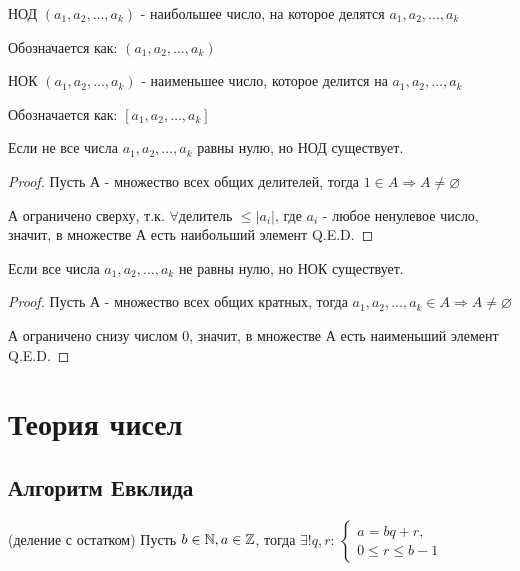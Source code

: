 \begin{definition}
    НОД $(a_1, a_2, \ldots, a_k)$ - наибольшее число, на которое делятся $a_1, a_2, \ldots, a_k$

    Обозначается как: $(a_1, a_2, \ldots, a_k)$
\end{definition}

\begin{definition}
    НОК $(a_1, a_2, \ldots, a_k)$ - наименьшее число, которое делится на $a_1, a_2, \ldots, a_k$

    Обозначается как: $[a_1, a_2, \ldots, a_k]$
\end{definition}

\begin{theorem}
    Если не все числа $a_1, a_2, \ldots, a_k$ равны нулю, но НОД существует.
\end{theorem}

\begin{proof}
    Пусть А - множество всех общих делителей, тогда $1 \in A \Rightarrow A \neq \varnothing$

    А ограничено сверху, т.к. $\forall \text{делитель } \leq |a_i|$, где $a_i$ - любое ненулевое число, значит, в множестве А есть наибольший элемент Q.E.D.
\end{proof}

\begin{theorem}
    Если все числа $a_1, a_2, \ldots, a_k$ не равны нулю, но НОК существует.
\end{theorem}



\begin{proof}
    Пусть А - множество всех общих кратных, тогда $a_1, a_2, \ldots, a_k \in A \Rightarrow A \neq \varnothing$

    А ограничено снизу числом 0, значит, в множестве А есть наименьший элемент Q.E.D.
\end{proof}

\chapter{Теория чисел}
\section{Алгоритм Евклида}

\begin{theorem} (деление с остатком)
    Пусть $b \in \mathbb{N}, a \in \mathbb{Z}$, тогда $\exists! q, r$: 
    $\begin{cases} 
        a= bq + r,\\ 
        0 \leq r \leq b - 1
    \end{cases}$
\end{theorem}


